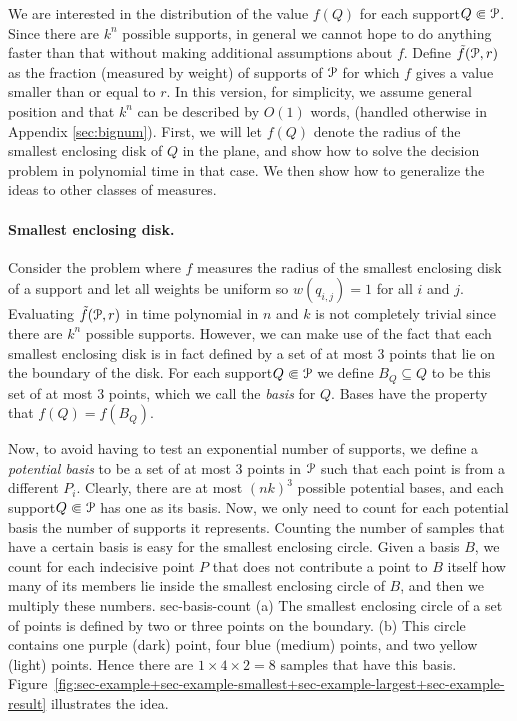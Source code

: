 \documentclass{journal}
\newcommand{\Eu}[1]{\ensuremath{\EuScript{#1}}}
\newcommand{\pset}{support\xspace}
\newcommand{\psets}{supports\xspace}
\begin{document}
We are interested in the distribution of the value $f(Q)$ for each \pset $Q \Subset \Eu P$.  Since there are $k^n$ possible \psets, in general we cannot hope to do anything faster than that without making additional assumptions about $f$.
Define $\tilde f (\Eu P, r)$ as the fraction (measured by weight) of \psets of $\Eu P$ for which $f$ gives a value smaller than or equal to $r$.
In this version, for simplicity, we assume general position and that $k^n$ can be described by $O(1)$ words, (handled otherwise in Appendix \ref{sec:bignum}).  
First, we will let $f (Q)$ denote the radius of the smallest enclosing disk of $Q$ in the plane, and show how to solve the decision problem in polynomial time in that case. We then show how to generalize the ideas to other classes of measures.

\paragraph{Smallest enclosing disk.}
Consider the problem where $f$ measures the radius of the smallest enclosing disk of a \pset and let all weights be uniform so $w(q_{i,j}) = 1$ for all $i$ and $j$.  
Evaluating $\tilde f(\Eu P, r)$ in time polynomial in $n$ and $k$ is not completely trivial since there are $k^n$ possible \psets.  However, we can make use of the fact that each smallest enclosing disk is in fact defined by a set of at most $3$ points that lie on the boundary of the disk. 
For each \pset $Q \Subset \Eu P$ we define $B_Q \subseteq Q$ to be this set of at most $3$ points, which we call the \emph {basis} for $Q$.
Bases have the property that $f(Q) = f(B_Q)$.

Now, to avoid having to test an exponential number of \psets, we define a \emph{potential basis} to be a set of at most $3$ points in $\Eu P$ such that each point is from a different $P_i$. Clearly, there are at most $(nk)^3$ possible potential bases, and each \pset $Q \Subset \Eu P$ has one as its basis.
Now, we only need to count for each potential basis the number of \psets it represents.
Counting the number of samples that have a certain basis is easy for the smallest enclosing circle. Given a basis $B$, we count for each indecisive point $P$ that does not contribute a point to $B$ itself how many of its members lie inside the smallest enclosing circle of $B$, and then we multiply these numbers.
 {sec-basis-count} {(a) The smallest enclosing circle of a set of points is defined by two or three points on the boundary. (b) This circle contains one purple (dark) point, four blue (medium) points, and two yellow (light) points. Hence there are $1 \times 4 \times 2 = 8$ samples that have this basis.}
Figure~\ref {fig:sec-example+sec-example-smallest+sec-example-largest+sec-example-result} illustrates the idea.
\end{document}
